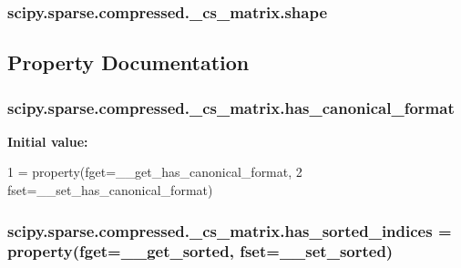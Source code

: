 \subsubsection[{shape}]{\setlength{\rightskip}{0pt plus 5cm}scipy.\+sparse.\+compressed.\+\_\+cs\+\_\+matrix.\+shape}\label{classscipy_1_1sparse_1_1compressed_1_1__cs__matrix_a96352422bdc7218081a6f6812a61c136}


\subsection{Property Documentation}
\hypertarget{classscipy_1_1sparse_1_1compressed_1_1__cs__matrix_a40ac43577f7746a5b5e24890efe80442}{}
\subsubsection[{has\+\_\+canonical\+\_\+format}]{\setlength{\rightskip}{0pt plus 5cm}scipy.\+sparse.\+compressed.\+\_\+cs\+\_\+matrix.\+has\+\_\+canonical\+\_\+format\hspace{0.3cm}{\ttfamily [static]}}\label{classscipy_1_1sparse_1_1compressed_1_1__cs__matrix_a40ac43577f7746a5b5e24890efe80442}
{\bfseries Initial value\+:}
\begin{DoxyCode}
1 = property(fget=\_\_get\_has\_canonical\_format,
2                                     fset=\_\_set\_has\_canonical\_format)
\end{DoxyCode}
\hypertarget{classscipy_1_1sparse_1_1compressed_1_1__cs__matrix_a631319b4774678b04f1ce0072ef82af4}{}
\subsubsection[{has\+\_\+sorted\+\_\+indices}]{\setlength{\rightskip}{0pt plus 5cm}scipy.\+sparse.\+compressed.\+\_\+cs\+\_\+matrix.\+has\+\_\+sorted\+\_\+indices = property(fget=\+\_\+\+\_\+get\+\_\+sorted, fset=\+\_\+\+\_\+set\+\_\+sorted)\hspace{0.3cm}{\ttfamily [static]}}\label{classscipy_1_1sparse_1_1compressed_1_1__cs__matrix_a631319b4774678b04f1ce0072ef82af4}
\hypertarget{classscipy_1_1sparse_1_1compressed_1_1__cs__matrix_a1140a7bbe239d44015eaac4c80098332}{}
